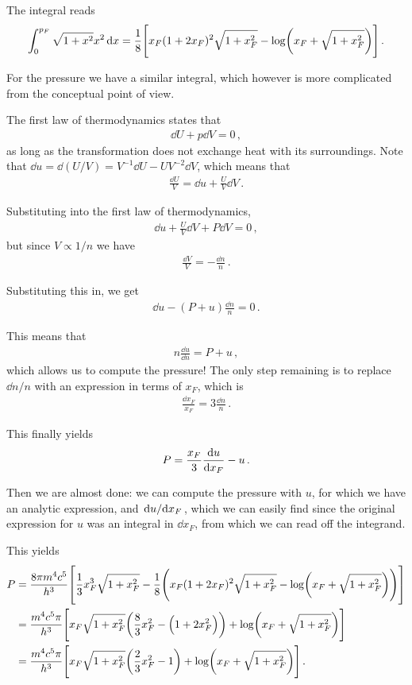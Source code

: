\documentclass[main.tex]{subfiles}
\begin{document}
The integral reads 
%
\begin{align}
\int_0^{p_F} \sqrt{1 + x^2} x^2 \dd{x} = \frac{1}{8} \qty[x_F (1 + 2 x_F)^2 \sqrt{1 + x_F^2} - \log(x_F + \sqrt{1 + x_F^2})]
\,.
\end{align}

For the pressure we have a similar integral, which however is more complicated from the conceptual point of view. 

The first law of thermodynamics states that 
%
\begin{align}
\dd{U} + p \dd{V} = 0
\,,
\end{align}
%
as long as the transformation does not exchange heat with its surroundings. 
Note that \(\dd{u} = \dd{(U/ V)} = V^{-1} \dd{U} - U V^{-2} \dd{V}\), which means that 
%
\begin{align}
\frac{ \dd{U}}{V} = \dd{u} + \frac{U}{V} \dd{V}
\,.
\end{align}

Substituting into the first law of thermodynamics, 
%
\begin{align}
\dd{u} + \frac{U}{V} \dd{V} + P \dd{V} = 0
\,,
\end{align}
%
but since \(V \propto 1/n\) we have 
%
\begin{align}
\frac{ \dd{V}}{V} = - \frac{ \dd{n}}{n}
\,.
\end{align}

Substituting this in, we get 
%
\begin{align}
\dd{u} - (P+u) \frac{ \dd{n}}{n} = 0 
\,.
\end{align}

This means that 
%
\begin{align}
n \frac{\dd{u}}{ \dd{n}} = P + u
\,,
\end{align}
%
which allows us to compute the pressure! 
The only step remaining is to replace \(\dd{n} / n\) with an expression in terms of \(x_F\), which is 
%
\begin{align}
\frac{ \dd{x_F}}{x_F} = 3 \frac{ \dd{n}}{n}
\,.
\end{align}

This finally yields 
%
\begin{align}
P = \frac{x_F}{3} \dv{u}{x_F} - u
\,.
\end{align}

Then we are almost done: we can compute the pressure with \(u\), for which we have an analytic expression, and \(\dv*{u}{x_F}\), which we can easily find since the original expression for \(u\) was an integral in \(\dd{x_F}\), from which we can read off the integrand. 

This yields 
%
\begin{align}
P &= \frac{8 \pi m^4 c^{5}}{h^3} \qty[ 
    \frac{1}{3} x_F^3 \sqrt{1 + x_F^2 } 
    - \frac{1}{8} \qty(x_F (1 + 2 x_F)^2 \sqrt{1 + x_F^2} 
    - \log(x_F + \sqrt{1 + x_F^2}))
]  \\
&= \frac{m^4 c^{5} \pi }{h^3}
\qty[
    x_F \sqrt{1 + x_F^2}
    \qty( \frac{8}{3} x_F^2 - \qty(1 + 2 x_F^2))
    + \log(x_F + \sqrt{1 + x_F^2})
]  \\
&= \frac{m^4 c^{5} \pi }{h^3} \qty[
    x_F \sqrt{1+ x_F^2} 
    \qty( \frac{2}{3} x_F^2 - 1)
    +
    \log(x_F + \sqrt{1 + x_F^2})
]
\,.
\end{align}
\end{document}
